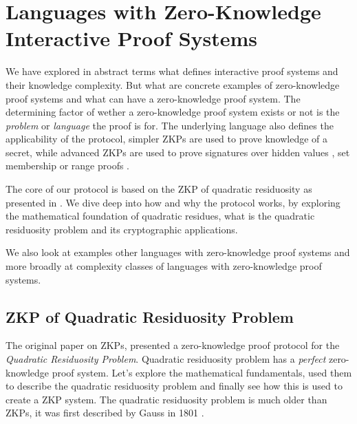 \section{Languages with Zero-Knowledge Interactive Proof Systems}
We have explored in abstract terms what defines interactive proof systems and their knowledge complexity.
But what are concrete examples of zero-knowledge proof systems and what can have a zero-knowledge proof system.
The determining factor of wether a zero-knowledge proof system exists or not is the \textit{problem} or \textit{language} the proof is for.
The underlying language also defines the applicability of the protocol, simpler ZKPs are used to prove knowledge of a secret, while advanced ZKPs are used to prove signatures over hidden values \cite{bunz2018bulletproofs, camenisch2001efficient, bowe2018multi}, set membership or range proofs \cite{camenisch2008efficient}.


The core of our protocol is based on the ZKP of quadratic residuosity as presented in \cite{goldwasser1989knowledge}.
We dive deep into how and why the protocol works, by exploring the mathematical foundation of quadratic residues, what is the quadratic residuosity problem and its cryptographic applications.

We also look at examples other languages with zero-knowledge proof systems and more broadly at complexity classes of languages with zero-knowledge proof systems.
%
%

\subsection{ZKP of Quadratic Residuosity Problem}
\label{zkp-qrp}
The original paper \cite{goldwasser1989knowledge} on ZKPs, presented a zero-knowledge proof protocol for the  \textit{Quadratic Residuosity Problem}.
Quadratic residuosity problem has a \textit{perfect} zero-knowledge proof system.
Let's explore the mathematical fundamentals, used them to describe the quadratic residuosity problem and finally see how this is used to create a ZKP system.
The quadratic residuosity problem is much older than ZKPs, it was first described by Gauss in 1801 \cite{gauss1801disquisitiones}.


